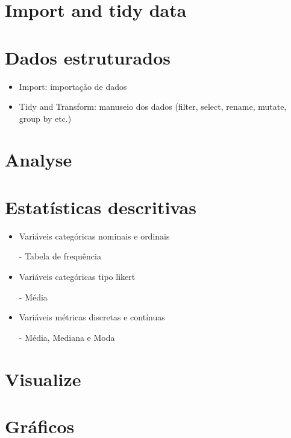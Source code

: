 \documentclass[a4paper,12pt]{article}
\begin{document}
\section{Import and tidy data}
\section*{Dados estruturados}

\begin{itemize}
    \item Import: importação de dados

    \item Tidy and Transform: manuseio dos dados (filter, select, rename, mutate, group by etc.)

\end{itemize}

\pagebreak

\section{Analyse} \nocite{angrist_mastering_2015}\nocite{imai_quantitative_2017}
\section*{Estatísticas descritivas}

\begin{itemize}
    \item Variáveis categóricas nominais e ordinais

    \item[-] Tabela de frequência

    \item Variáveis categóricas tipo likert

    \item[-] Média

     \item Variáveis métricas discretas e contínuas

     \item[-] Média, Mediana e Moda

\end{itemize}

\section{Visualize}
\section*{Gráficos}
\end{document}
